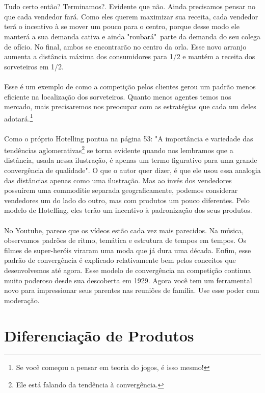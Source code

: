 \documentclass[a4paper,11pt,oneside]{book}
\theoremstyle{definition}
\theoremstyle{break}
\begin{document}
\\
\\
Tudo certo então? Terminamos?. Evidente que não. Ainda precisamos pensar no que cada vendedor fará. Como eles querem maximizar sua receita, cada vendedor terá o incentivo à se mover um pouco para o centro, porque desse modo ele manterá a sua demanda cativa e ainda "roubará"\ parte da demanda do seu colega de ofício. No final, ambos se encontrarão no centro da orla. Esse novo arranjo aumenta a distância máxima dos consumidores para 1/2 e mantém a receita dos sorveteiros em 1/2.
\\
\\
Esse é um exemplo de como a competição pelos clientes gerou um padrão menos eficiente na localização dos sorveteiros. Quanto menos agentes temos nos mercado, mais precisaremos nos preocupar com as estratégias que cada um deles adotará.\footnote{Se você começou a pensar em teoria do jogos, é isso mesmo!}
\\
\\
Como o próprio Hotelling pontua na página 53: "A importância e variedade das tendências aglomerativas\footnote{Ele está falando da tendência à convergência.} se torna evidente quando nos lembramos que a distância, usada nessa ilustração, é apenas um termo figurativo para uma grande convergência de qualidade". O que o autor quer dizer, é que ele usou essa analogia das distâncias apenas como uma ilustração. Mas ao invés dos vendedores possuírem uma commoditie separada geograficamente, podemos considerar vendedores um do lado do outro, mas com produtos um pouco diferentes. Pelo modelo de Hotelling, eles terão um incentivo à padronização dos seus produtos.
\\
\\
No Youtube, parece que os vídeos estão cada vez mais parecidos. Na música, observamos padrões de ritmo, temática e estrutura de tempos em tempos. Os filmes de super-heróis viraram uma moda que já dura uma década. Enfim, esse padrão de convergência é explicado relativamente bem pelos conceitos que desenvolvemos até agora. Esse modelo de convergência na competição continua muito poderoso desde sua descoberta em 1929. Agora você tem um ferramental novo para impressionar seus parentes nas reuniões de família. Use esse poder com moderação.

\section{Diferenciação de Produtos}
\end{document}
